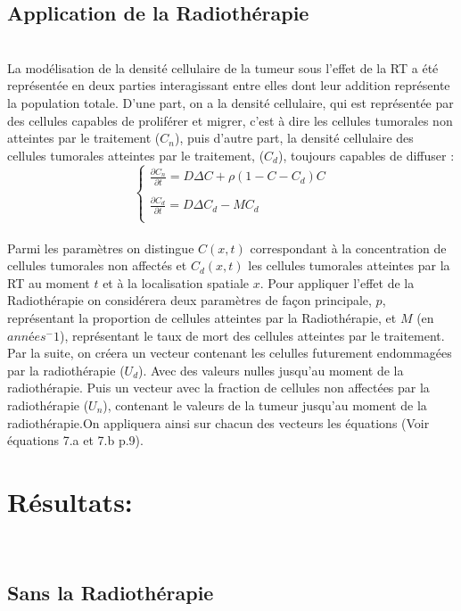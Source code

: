 \documentclass[12pt,a4paper]{article}
\begin{document}
\subsection{Application de la Radiothérapie}
\\
La modélisation de la densité cellulaire de la tumeur sous l’effet de la RT a été représentée en deux parties interagissant entre elles dont leur addition représente la population totale. D’une part, on a la densité cellulaire, qui est représentée par des cellules capables de proliférer et migrer, c’est à dire les cellules tumorales non atteintes par le traitement ($C_n$), puis d’autre part, la densité cellulaire des cellules tumorales atteintes par le traitement, ($C_d$), toujours capables de diffuser \cite{n} :\\

\begin{equation}
    \left\{
    \begin{array}{ll}
        \frac{\partial C_n}{\partial t}  = D\Delta C + \rho (1 - C - C_d) C \\
        \\
        \frac{\partial C_d}{\partial t}  = D\Delta C_d - M C_d \\
    \end{array}
\right.
\end{equation}
\\
	Parmi les paramètres on distingue $C(x,t)$ correspondant à la concentration de cellules tumorales non affectés  et $C_d(x,t)$ les cellules tumorales atteintes par la RT au moment $t$ et à la localisation spatiale $x$. 
Pour appliquer l'effet de la Radiothérapie on considérera deux paramètres de façon principale, $p$, représentant la proportion de cellules atteintes par la Radiothérapie, et $M$ (en $années^-1$), représentant le taux de mort des cellules atteintes par le traitement. Par la suite, on créera un vecteur contenant les celulles futurement endommagées par la radiothérapie ($U_d$). Avec des valeurs nulles jusqu'au moment de la radiothérapie. Puis un vecteur avec la fraction de cellules non affectées par la radiothérapie ($U_n$), contenant le valeurs de la tumeur jusqu'au moment de la radiothérapie.On appliquera ainsi sur chacun des vecteurs les équations (Voir équations 7.a et 7.b p.9). 

\section{Résultats: }
\\
\subsection{Sans la Radiothérapie}
\\
\end{document}
